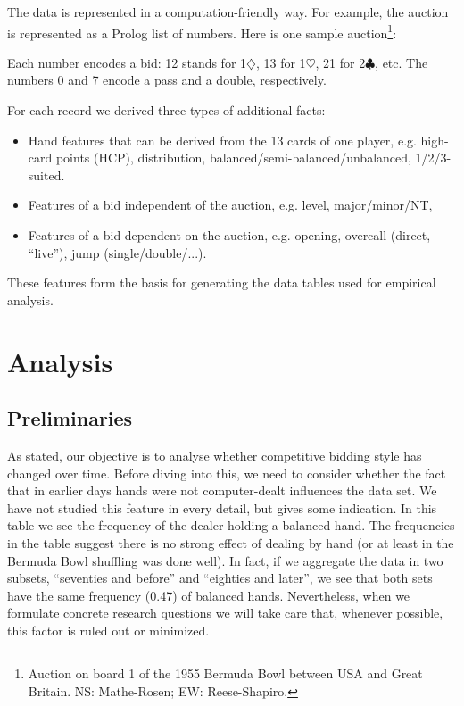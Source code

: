 \documentclass{llncs}
\begin{document}
The data is represented in a computation-friendly way. For example,
the auction is represented as a Prolog list of numbers. Here is one
sample auction\footnote{%
Auction on board 1 of the 1955 Bermuda Bowl between USA and Great
Britain. NS: Mathe-Rosen; EW: Reese-Shapiro.}:

\begin{code}
    [12,13,7,0,0,21,22,31,32,0,0,0]
\end{code}

Each number encodes a bid: 12 stands for
1$\diamondsuit$, 13 for 1$\heartsuit$, 21 for 2$\clubsuit$, etc. The
numbers 0 and 7 encode a pass and a double, respectively. 

For each record we derived three types of additional facts: 
\begin{itemize}
\item Hand features that can be derived from the 13 cards
of one player, e.g. high-card points (HCP), distribution,
balanced/semi-balanced/unbalanced, 1/2/3-suited.
\item Features of a bid independent of the auction,
e.g. level, major/minor/NT, 
\item Features of a bid dependent on the auction, e.g. opening,
overcall (direct, ``live''), jump (single/double/...). 
\end{itemize}
 
These features form the basis for generating the data tables used for
empirical analysis. 


\section{Analysis}
\label{sec:analysis}

\subsection{Preliminaries}

As stated, our objective is to analyse whether competitive bidding
style  has changed over time.  Before diving into this, we need to consider
whether the fact that in earlier days hands were not computer-dealt
influences the data set. We have not studied this feature in every detail,
but  gives some indication. In this table
we see the frequency of the dealer holding a balanced hand. The
frequencies in the  table
suggest there is no strong effect of dealing by hand (or at least in
the Bermuda Bowl shuffling was done well). In fact, if we
aggregate the data in two subsets, ``seventies and before'' and
``eighties and later'', we see that both sets have the same frequency
(0.47) of balanced hands. Nevertheless, when 
we  formulate concrete research questions we will take care that,
whenever possible, this factor is ruled out or minimized.     
\end{document}
